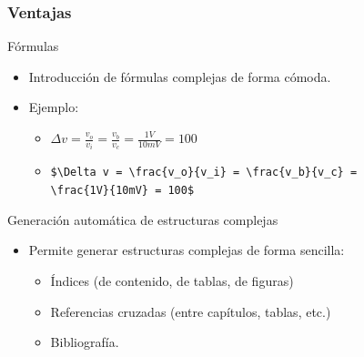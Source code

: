 \documentclass[aspectratio=1610]{beamer}%
\begin{document}
\begin{frame}[fragile]
\frametitle{\textbf{Ventajas}}
\justifying
 \begin{block}{Fórmulas}
\begin{itemize}\justifying
  \item Introducción de fórmulas complejas de forma cómoda.
  \item Ejemplo:
  \begin{itemize}\justifying
  \item $\Delta v = \frac{v_o}{v_i} = \frac{v_b}{v_c} = \frac{1V}{10mV} = 100$
  \item \verb+$\Delta v = \frac{v_o}{v_i} = \frac{v_b}{v_c} = +\\\verb+\frac{1V}{10mV} = 100$+
\end{itemize}

\end{itemize}

\end{block}

\begin{block}{Generación automática de estructuras complejas}
\begin{itemize}\justifying
  \item Permite generar estructuras complejas de forma sencilla:
  \begin{itemize}\justifying
  \item Índices (de contenido, de tablas, de figuras)
  \item Referencias cruzadas (entre capítulos, tablas, etc.)
  \item Bibliografía.
\end{itemize}

\end{itemize}

\end{block}


\end{frame}
\end{document}
